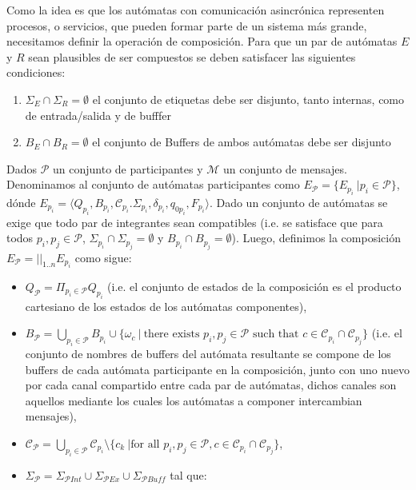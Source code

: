 Como la idea es que los autómatas con comunicación asincrónica representen procesos, o servicios, que pueden formar parte de un sistema más grande, necesitamos definir la operación de composición. Para que un par de autómatas $E$ y $R$ sean plausibles de ser compuestos se deben satisfacer las siguientes condiciones:
 \begin{enumerate}
\item $\Sigma_E \cap \Sigma_R = \emptyset$ el conjunto de etiquetas debe ser disjunto, tanto internas, como de entrada/salida y de bufffer
\item $ B_E \cap B_R = \emptyset$ el conjunto de Buffers de ambos autómatas debe ser disjunto  
\end{enumerate}
\begin{definition}[Composición]
Dados $\mathcal{P}$ un conjunto de participantes y $\mathcal{M}$ un conjunto de mensajes. Denominamos al conjunto de autómatas participantes como $E_\mathcal{P} = \{E_{p_i} \ | p_i \in \mathcal{P}\}$, dónde $E_{p_i}= \langle Q_{p_i}, B_{p_i}, \mathcal{C}_{p_i}. \Sigma_{p_i}, \delta_{p_i}, q_{0{p_i}}, F_{p_i} \rangle$. Dado un conjunto de autómatas se exige que todo par de integrantes sean compatibles (i.e. se satisface que para todos $p_i, p_j \in \mathcal{P}$, $\Sigma_{p_i} \cap \Sigma_{p_j}= \emptyset$ y $B_{p_i} \cap B_{p_j} = \emptyset$). Luego, definimos la composición $E_\mathcal{P} = ||_{1..n} E_{p_i}$ como sigue:
\begin{itemize}
    \item $Q_\mathcal{P}= \Pi_{p_i \in \mathcal{P}} Q_{p_i}$ (i.e. el conjunto de estados de la composición es el producto cartesiano de los estados de los autómatas componentes),    
    \item $B_\mathcal{P} = \bigcup_{p_i \in \mathcal{P}} B_{p_i} \cup \{ \omega_c \ | \ \mbox{there exists } p_i, p_j \in \mathcal{P} \mbox{ such that } c \in \mathcal{C}_{p_i} \cap \mathcal{C}_{p_j} \}$ (i.e. el conjunto de nombres de buffers del autómata resultante se compone de los buffers de cada autómata participante en la composición, junto con uno nuevo por cada canal compartido entre cada par de autómatas, dichos canales son aquellos mediante los cuales los autómatas a componer intercambian mensajes),    
    \item $\mathcal{C}_\mathcal{P} = \bigcup_{p_i \in \mathcal{P}} \mathcal{C}_{p_i} \setminus \{ c_k \ | \mbox{for all } p_i, p_j \in \mathcal{P}, c \in \mathcal{C}_{p_i} \cap \mathcal{C}_{p_j} \}$,    
    \item $\Sigma_\mathcal{P} = \Sigma_{\mathcal{P}\mathit{Int}} \cup  \Sigma_{\mathcal{P}\mathit{Ex}} \cup \Sigma_{\mathcal{P}\mathit{Buff}}$ tal que:    

\end{itemize}
\end{definition}
